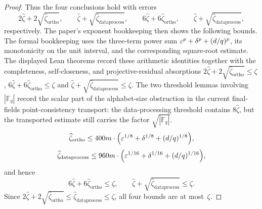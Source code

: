 \begin{proof}
  Thus the four conclusions hold with errors
  \[
    2\widehat{\zeta} + 2\sqrt{\widehat{\zeta}_{\mathrm{ortho}}},
    \qquad
    \widehat{\zeta} + \sqrt{\widehat{\zeta}_{\mathrm{dataprocess}}},
    \qquad
    6 \widehat{\zeta} + 6\widehat{\zeta}_{\mathrm{ortho}},
    \qquad
    \widehat{\zeta} + \sqrt{\widehat{\zeta}_{\mathrm{dataprocess}}},
  \]
  respectively. The paper's exponent bookkeeping then shows the following
  bounds. The formal bookkeeping uses the three-term power sum
  $\varepsilon^p + \delta^p + (d/q)^p$, its monotonicity on the unit interval, and the
  corresponding square-root estimate. The displayed Lean theorems record these
  arithmetic identities together with the completeness, self-closeness, and
  projective-residual absorptions
  $2 \widehat{\zeta} + 2\sqrt{\widehat{\zeta}_{\mathrm{ortho}}} \le \zeta$,
  $6 \widehat{\zeta} + 6\widehat{\zeta}_{\mathrm{ortho}} \le \zeta$ and
  $\widehat{\zeta} + \sqrt{\widehat{\zeta}_{\mathrm{dataprocess}}} \le \zeta$.
  The two threshold lemmas involving \(|\mathbb F_q|\) record the scalar part of
  the alphabet-size obstruction in the current final-fields point-consistency
  transport: the data-processing threshold contains \(8\widehat{\zeta}\), but
  the transported estimate still carries the factor \(\sqrt{|\mathbb F_q|}\).
  \[
    \widehat{\zeta}_{\mathrm{ortho}}
    \leq 400 m \cdot \Big(\varepsilon^{1/8} + \delta^{1/8} + (d/q)^{1/8}\Big),
  \]
  \[
    \widehat{\zeta}_{\mathrm{dataprocess}}
    \leq 960m \cdot \Big(\varepsilon^{1/16} + \delta^{1/16} + (d/q)^{1/16}\Big),
  \]
  and hence
  \[
    6 \widehat{\zeta} + 6\widehat{\zeta}_{\mathrm{ortho}} \le \zeta,
    \qquad
    \widehat{\zeta} + \sqrt{\widehat{\zeta}_{\mathrm{dataprocess}}} \le \zeta.
  \]
  Since $2\widehat{\zeta} + 2\sqrt{\widehat{\zeta}_{\mathrm{ortho}}} \le \widehat{\zeta}_{\mathrm{dataprocess}} \le \zeta$, all four bounds are at most~$\zeta$.
\end{proof}
